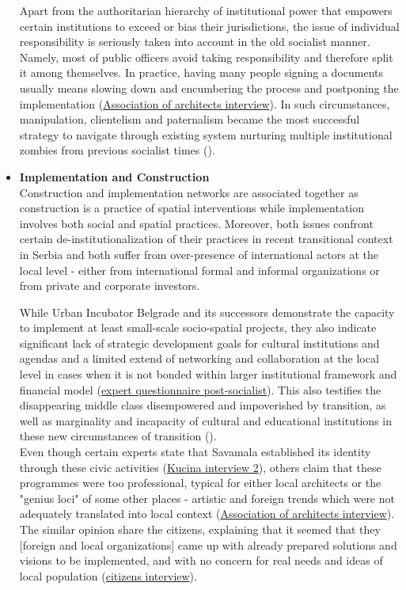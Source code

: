 \documentclass[11pt]{report}
\begin{document}
\begin{itemize}
Apart from the authoritarian hierarchy of institutional power that empowers certain institutions to exceed or bias their jurisdictions, the issue of individual responsibility is seriously taken into account in the old socialist manner. Namely, most of public officers avoid taking responsibility and therefore split it among themselves.
In practice, having many people signing a documents usually means slowing down and encumbering the process and postponing the implementation
(\href{}{Association of architects interview}).
In such circumstances, manipulation, clientelism and paternalism became the most successful strategy to navigate through existing system nurturing multiple institutional zombies from previous socialist times (\cite{Vujosevic 2012}). 
\\

\item \textbf{Implementation and Construction}
\\
Construction and implementation networks are associated together as construction is a practice of spatial interventions while implementation involves both social and spatial practices.
Moreover, both issues confront certain de-institutionalization of their practices in recent transitional context in Serbia and both suffer from over-presence of international actors at the local level - either from international formal and informal organizations or from private and corporate investors.

While Urban Incubator Belgrade and its successors demonstrate the capacity to implement at least small-scale socio-spatial projects, they also indicate significant lack of strategic development goals for cultural institutions and agendas and a limited extend of networking and collaboration at the local level in cases when it is not bonded within larger institutional framework and financial model (\href{}{expert questionnaire post-socialist}).
This also testifies the disappearing middle class disempowered and impoverished by transition, as well as marginality and incapacity of cultural and educational institutions in these new circumstances of transition (\cite{Samardzic in Doytchinov 2015}).
\\
Even though certain experts state that Savamala established its identity through these civic activities (\href{}{Kucina interview 2}), others claim that these programmes were too professional, typical for either local architects or the "genius loci" of some other places - artistic and foreign trends which were not adequately translated into local context (\href{}{Association of architects interview}).
The similar opinion share the citizens, explaining that it seemed that they [foreign and local organizations] came up with already prepared solutions and visions to be implemented, and with no concern for real needs and ideas of local population (\href{}{citizens interview}).


\end{itemize}
\end{document}
